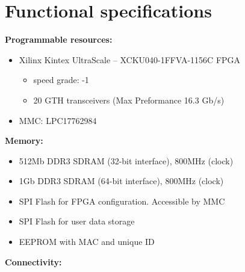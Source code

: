 %	
%
%	

\section{Functional specifications}

\noindent

\textbf{Programmable resources:}

\begin{itemize}
\item Xilinx Kintex UltraScale – XCKU040-1FFVA-1156C    FPGA
	\begin{itemize}
		\item speed grade: -1
		\item 20 GTH transceivers (Max Preformance 16.3 Gb/s)
	\end{itemize}
\item MMC: LPC17762984
\end{itemize}	

\textbf{Memory:}

\begin{itemize}
	\item 512Mb  DDR3 SDRAM (32-bit interface), 800MHz (clock)
	\item 1Gb  DDR3 SDRAM (64-bit interface), 800MHz (clock)
	\item SPI Flash for FPGA configuration. Accessible by MMC
	\item SPI Flash for user data storage
	\item EEPROM with MAC and unique ID 
	
\end{itemize}

\textbf{Connectivity:}

